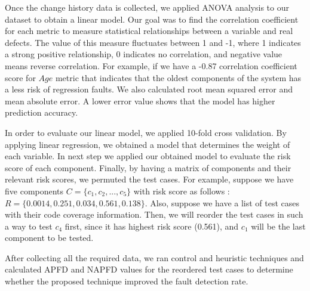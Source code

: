 Once the change history data is collected, we applied 
ANOVA analysis to our dataset to obtain a linear model.
Our goal was to find the correlation coefficient for each 
metric to measure statistical relationships between 
a variable and real defects. The value of this measure 
fluctuates between 1 and -1, where 1 indicates a strong 
positive relationship, 0 indicates no correlation, and 
negative value means reverse correlation.
For example, if we have a -0.87 correlation coefficient score for 
$Age$ metric that indicates that the oldest components of the system
has a less risk of regression faults.   
We also calculated root mean squared error and mean absolute error. 
A lower error value shows that the model has higher prediction accuracy. 
 

In order to evaluate our linear model, we applied 10-fold cross validation. 
By applying linear regression, we obtained a model that determines the weight 
of each variable. In next step we applied our obtained model  
to evaluate the risk score of each component. 
Finally, by having a matrix of components and their relevant risk scores, 
we permuted the test cases. For example, suppose we have five components
$C =\{c_1, c_2, ... , c_5\}$ with risk score 
as follows :   $R =\{0.0014, 0.251, 0.034 , 0.561, 0.138\}$.
Also, suppose we have a list of test cases with their code coverage information.
Then, we will reorder the test cases in such a way to test $c_4$ first, 
since it has highest risk score (0.561), and $c_1$ will be the last 
component to be tested. 

After collecting all the required data, we ran control and heuristic 
techniques and calculated APFD and NAPFD values for the reordered test cases 
to determine whether the proposed technique improved the fault detection rate. 

